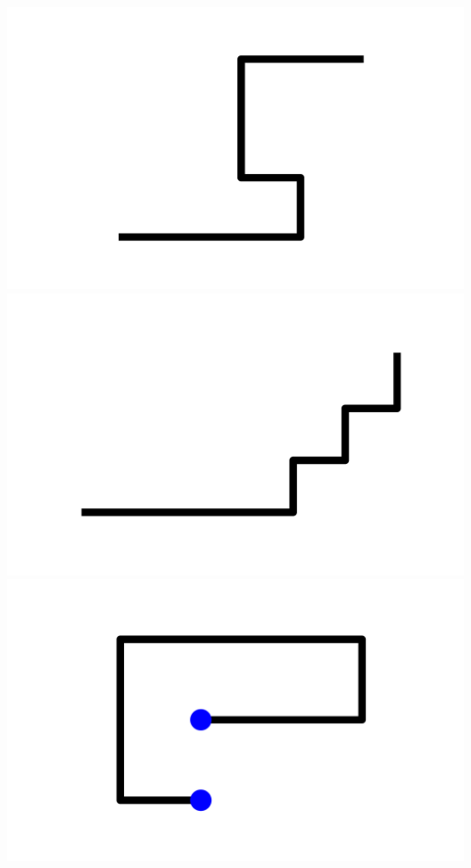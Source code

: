 \documentclass[]{report}
\begin{document}
\includegraphics[scale=.1]{pictures/21/state_cluster_shapes_466.pdf} 
\includegraphics[scale=.1]{pictures/21/state_cluster_shapes_467.pdf} 
\includegraphics[scale=.1]{pictures/21/state_cluster_shapes_468.pdf} 
\end{document}
